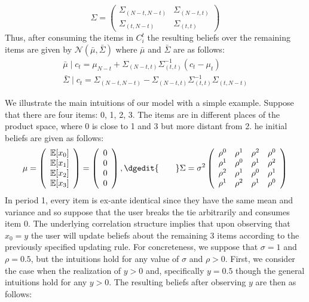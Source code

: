 \documentclass[manuscript]{acmart}
\newcommand{\xhdr}[1]{\vspace{1mm} \noindent{\bf #1}}
\begin{document}
\[ \Sigma =  \left( \begin{array}{cc}
\Sigma_{(N-t, N-t)} & \Sigma_{(N-t,t)} \\
\Sigma_{(t,N-t)} & \Sigma_{(t,t)}
\end{array} \right)
\]
Thus, after consuming the items in $C_{i}^{t}$ the resulting beliefs over the remaining items are given by $\mathcal{N}(\bar{\mu}, \bar{\Sigma})$ where $\bar{\mu}$ and $\bar{\Sigma}$ are as follows:
\begin{align*}
\bar{\mu} \mid c_t = \mu_{N-t} + \Sigma_{(N-t,t)} \Sigma_{(t,t)}^{-1}(c_t - \mu_t) \\
\bar{\Sigma} \mid c_t = \Sigma_{(N-t,N-t)} - \Sigma_{(N-t,t)} \Sigma_{(t,t)}^{-1} \Sigma_{(t,N-t)}
\end{align*}

\xhdr{An Illustrative Example\dgedit{.}} We illustrate the main intuitions of our model with a simple example. Suppose that there are four items: 0, 1, 2, 3. The items are in different places of the product space, where 0 is close to 1 and 3 but more distant from 2. he initial beliefs are given as follows:
\[ \mu = \left (\begin{array}{c}
\mathbb{E}[x_0] \\
\mathbb{E}[x_1] \\
\mathbb{E}[x_2] \\
\mathbb{E}[x_3]
\end{array}  \right) = \left (\begin{array}{c}
0 \\
0\\
0 \\
0
\end{array}  \right), \dgedit{\qquad}\Sigma =  \sigma^{2} \left( \begin{array}{cccc}
\rho^{0} & \rho^{1} & \rho^{2} & \rho^{0} \\
\rho^{1} & \rho^{0} & \rho^{1} & \rho^{2} \\
\rho^{2} & \rho^{1} & \rho^{0} & \rho^{1} \\
\rho^{1} & \rho^{2} & \rho^{1} & \rho^{0} \\
\end{array} \right)
\]
In period 1, every item is ex-ante identical since they have the same mean and variance and so suppose that the user breaks the tie arbitrarily and consumes item 0. The underlying correlation structure implies that upon observing that $x_0 = y$ the user will update beliefs about the remaining 3 items according to the previously specified updating rule. For concreteness, we suppose that $\sigma = 1$ and $\rho = 0.5$, but the intuitions hold for any value of $\sigma$ and $\rho > 0$. First, we consider the case when the realization of $y > 0$ and, specifically\dgedit{,}  $y = 0.5$\dgedit{ --} though the general intuitions hold for any $y > 0$. The resulting beliefs after observing $y$ are then as follows:
\end{document}
